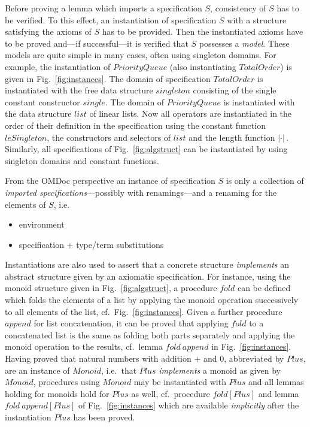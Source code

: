 \documentclass{article}
\theoremstyle{remark}
\theoremstyle{definition}
\newcommand{\name}[1]{\mathit{#1}}
\begin{document}
Before proving a lemma which imports a specification $S$, consistency of $S$ has to be verified. To this effect, an
instantiation of specification $S$ with a structure satisfying the axioms of $S$ has to be provided. Then the
instantiated axioms have to be proved and---if successful---it is verified that $S$ possesses a \emph{model}. These
models are quite simple in many cases, often using singleton domains. For example, the instantiation of
$\name{PriorityQueue}$ (also instantiating $\name{TotalOrder}$) is given in Fig.~\ref{fig:instances}. The domain of
specification $\name{TotalOrder}$ is instantiated with the free data structure $\name{singleton}$ consisting of the
single constant constructor $\name{single}$. The domain of $\name{PriorityQueue}$ is instantiated with the data
structure $\name{list}$ of linear lists. Now all operators are instantiated in the order of their definition in the
specification using the constant function $\name{leSingleton}$, the constructors and selectors of $\name{list}$ and the
length function $| \cdot |\,$. Similarly, all specifications of Fig.~\ref{fig:algstruct} can be instantiated by using
singleton domains and constant functions.

From the OMDoc perspective an instance of specification $S$ is only a collection of \emph{imported
specifications}---possibly with renamings---and a renaming for the elements of $S$, i.e.\
\begin{itemize}
  \item environment
  \item specification + type/term substitutions
\end{itemize}


Instantiations are also used to assert that a concrete structure \emph{implements} an abstract structure given by an
axiomatic specification. For instance, using the monoid structure given in Fig.~\ref{fig:algstruct}, a procedure
$\name{fold}$ can be defined which folds the elements of a list by applying the monoid operation successively to all
elements of the list, cf.~Fig.~\ref{fig:instances}. Given a further procedure $\name{append}$ for list concatenation,
it can be proved that applying $\name{fold}$ to a concatenated list is the same as folding both parts separately and
applying the monoid operation to the results, cf.\ lemma $\name{fold}\ \name{append}$ in Fig.~\ref{fig:instances}.
Having proved that natural numbers with addition $+$ and $0$, abbreviated by $\name{Plus}$, are an instance of
$\name{Monoid}$, i.e.\ that $\name{Plus}$ \emph{implements} a monoid as given by $\name{Monoid}$, procedures using
$\name{Monoid}$ may be instantiated with $\name{Plus}$ and all lemmas holding for monoids hold for $\name{Plus}$ as
well, cf.\ procedure $\name{fold}[\name{Plus}]$ and lemma $\name{fold}\ \name{append}[\name{Plus}]$ of
Fig.~\ref{fig:instances} which are available \emph{implicitly} after the instantiation $\name{Plus}$ has been proved.
\end{document}
